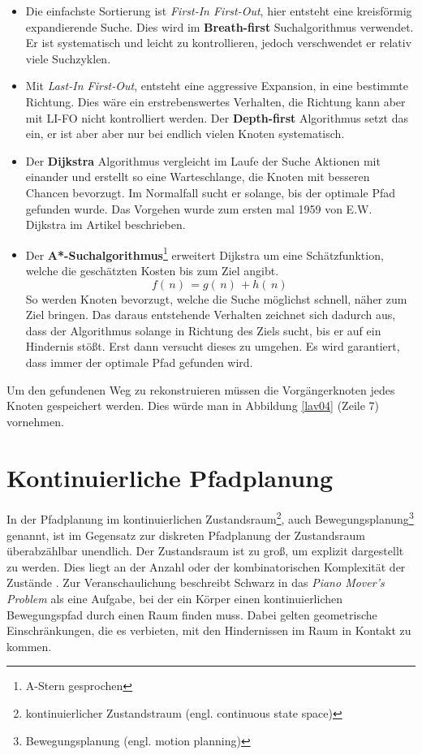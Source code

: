 	\begin{itemize}
		\item Die einfachste Sortierung ist \textit{First-In First-Out}, hier entsteht eine kreisförmig expandierende Suche. Dies wird im \textbf{Breath-first} Suchalgorithmus verwendet. Er ist systematisch und leicht zu kontrollieren, jedoch verschwendet er relativ viele Suchzyklen\cite[~S. 35]{Lav06}.
		\item Mit \textit{Last-In First-Out}, entsteht eine aggressive Expansion, in eine bestimmte Richtung. 
		Dies wäre ein erstrebenswertes Verhalten, die Richtung kann aber mit LI-FO nicht kontrolliert werden. Der \textbf{Depth-first} Algorithmus setzt das ein, er ist aber aber nur bei endlich vielen Knoten systematisch\cite[~S. 36]{Lav06}.
		\item Der \textbf{Dijkstra} Algorithmus vergleicht im Laufe der Suche Aktionen mit einander und erstellt so eine Warteschlange, die Knoten mit besseren Chancen bevorzugt. Im Normalfall sucht er solange, bis der optimale Pfad gefunden wurde. Das Vorgehen wurde zum ersten mal 1959 von E.W. Dijkstra im Artikel \cite{dijkstra:59} beschrieben.
		\item Der \textbf{A*-Suchalgorithmus}\footnote{A-Stern gesprochen} erweitert Dijkstra um eine Schätzfunktion, welche die geschätzten Kosten bis zum Ziel angibt.
		$$f( \, n ) \, = g ( \, n ) \, + h ( \, n ) \,$$
		So werden Knoten bevorzugt, welche die Suche möglichst schnell, näher zum Ziel bringen. Das daraus entstehende Verhalten zeichnet sich dadurch aus, dass der Algorithmus solange in Richtung des Ziels sucht, bis er auf ein Hindernis stößt. Erst dann versucht dieses zu umgehen. Es wird garantiert, dass immer der optimale Pfad gefunden wird.\cite[~S. 37]{Lav06}
	\end{itemize}
Um den gefundenen Weg zu rekonstruieren müssen die Vorgängerknoten jedes Knoten gespeichert werden. Dies würde man in Abbildung \ref{lav04} (Zeile 7) vornehmen. 


\section{Kontinuierliche Pfadplanung} \label{Kapitel 4.4}
In der Pfadplanung im kontinuierlichen Zustandsraum\footnote{kontinuierlicher Zustandstraum (engl. continuous state space)}, auch Bewegungsplanung\footnote{Bewegungsplanung (engl. motion planning)} genannt, ist im Gegensatz zur diskreten Pfadplanung der Zustandsraum überabzählbar unendlich.  Der Zustandsraum ist zu groß, um explizit dargestellt zu werden. Dies liegt an der Anzahl oder der kombinatorischen Komplexität der Zustände \cite[~S. 17]{Lav06}.
Zur Veranschaulichung beschreibt Schwarz in \cite{Schw83} das \textit{Piano Mover's Problem} als eine Aufgabe, bei der ein Körper einen kontinuierlichen Bewegungspfad durch einen Raum finden muss. Dabei gelten geometrische Einschränkungen, die es verbieten, mit den Hindernissen im Raum in Kontakt zu kommen.


